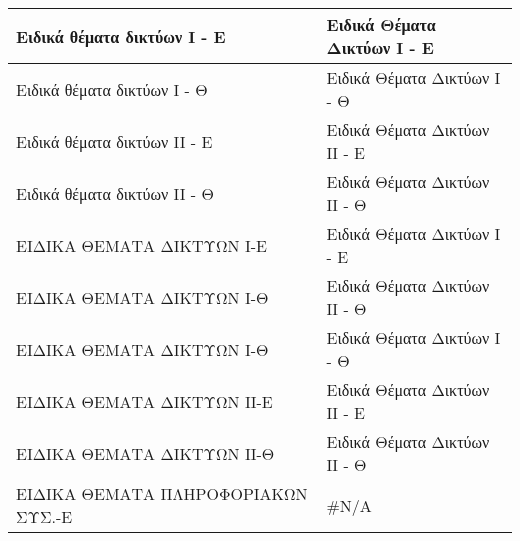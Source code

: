 \documentclass[12pt,a4paper,final]{article}
\begin{document}
\begin{landscape}
\begin{center}
\begin{longtable}{|l|l|}
\hline
Ειδικά θέματα δικτύων I - Ε                                                                                     & Ειδικά Θέματα Δικτύων Ι - Ε                                                                                          \\ 
\hline
Ειδικά θέματα δικτύων I - Θ                                                                                     & Ειδικά Θέματα Δικτύων Ι - Θ                                                                                          \\ 
\hline
Ειδικά θέματα δικτύων II - Ε                                                                                    & Ειδικά Θέματα Δικτύων ΙΙ - Ε                                                                                         \\ 
\hline
Ειδικά θέματα δικτύων II - Θ                                                                                    & Ειδικά Θέματα Δικτύων ΙΙ - Θ                                                                                         \\ 
\hline
ΕΙΔΙΚΑ ΘΕΜΑΤΑ ΔΙΚΤΥΩΝ Ι-Ε                                                                                       & Ειδικά Θέματα Δικτύων Ι - Ε                                                                                          \\ 
\hline
ΕΙΔΙΚΑ ΘΕΜΑΤΑ ΔΙΚΤΥΩΝ Ι-Θ                                                                                       & Ειδικά Θέματα Δικτύων ΙΙ - Θ                                                                                         \\ 
\hline
ΕΙΔΙΚΑ ΘΕΜΑΤΑ ΔΙΚΤΥΩΝ Ι-Θ                                                                                       & Ειδικά Θέματα Δικτύων Ι - Θ                                                                                          \\ 
\hline
ΕΙΔΙΚΑ ΘΕΜΑΤΑ ΔΙΚΤΥΩΝ ΙΙ-Ε                                                                                      & Ειδικά Θέματα Δικτύων ΙΙ - Ε                                                                                         \\ 
\hline
ΕΙΔΙΚΑ ΘΕΜΑΤΑ ΔΙΚΤΥΩΝ ΙΙ-Θ                                                                                      & Ειδικά Θέματα Δικτύων ΙΙ - Θ                                                                                         \\ 
\hline
ΕΙΔΙΚΑ ΘΕΜΑΤΑ ΠΛΗΡΟΦΟΡΙΑΚΩΝ ΣΥΣ.-Ε                                                                              & \#N/A                                                                                                                \\ 

\end{longtable}
\end{center}
\end{landscape}
\end{document}
